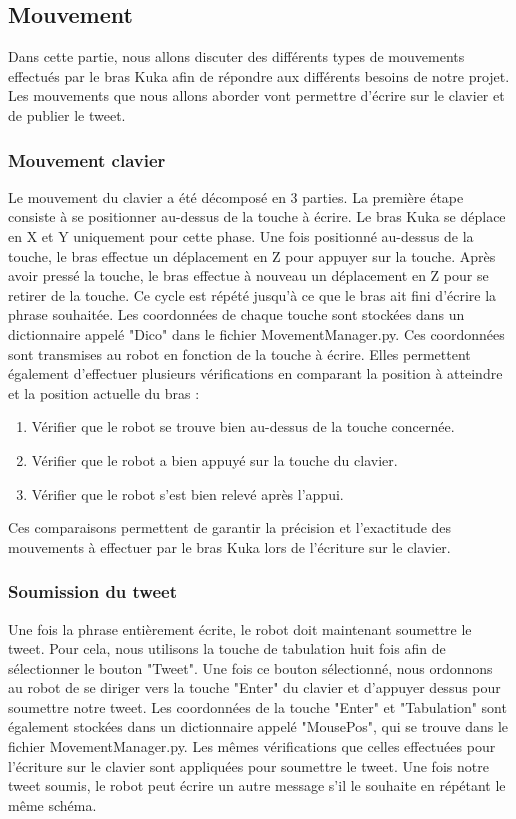 \subsection{Mouvement}

Dans cette partie, nous allons discuter des différents types de mouvements effectués par le bras Kuka afin de répondre aux différents besoins de notre projet. 
Les mouvements que nous allons aborder vont permettre d'écrire sur le clavier et de publier le tweet.

\subsubsection{Mouvement clavier}

Le mouvement du clavier a été décomposé en 3 parties.
La première étape consiste à se positionner au-dessus de la touche à écrire.
Le bras Kuka se déplace en X et Y uniquement pour cette phase. 
Une fois positionné au-dessus de la touche, le bras effectue un déplacement en Z pour appuyer sur la touche. 
Après avoir pressé la touche, le bras effectue à nouveau un déplacement en Z pour se retirer de la touche. 
Ce cycle est répété jusqu'à ce que le bras ait fini d'écrire la phrase souhaitée.
Les coordonnées de chaque touche sont stockées dans un dictionnaire appelé "Dico" dans le fichier MovementManager.py.
Ces coordonnées sont transmises au robot en fonction de la touche à écrire.
Elles permettent également d'effectuer plusieurs vérifications en comparant la position à atteindre et la position actuelle du bras :

\begin{enumerate}
    \item Vérifier que le robot se trouve bien au-dessus de la touche concernée.
    \item Vérifier que le robot a bien appuyé sur la touche du clavier.
    \item Vérifier que le robot s'est bien relevé après l'appui.
\end{enumerate}

Ces comparaisons permettent de garantir la précision et l’exactitude des mouvements à
effectuer par le bras Kuka lors de l’écriture sur le clavier.

\subsubsection{Soumission du tweet}

Une fois la phrase entièrement écrite, le robot doit maintenant soumettre le tweet.
Pour cela, nous utilisons la touche de tabulation huit fois afin de sélectionner le bouton "Tweet".
Une fois ce bouton sélectionné, nous ordonnons au robot de se diriger vers la touche "Enter" du clavier et d'appuyer dessus pour soumettre notre tweet.
Les coordonnées de la touche "Enter" et "Tabulation" sont également stockées dans un dictionnaire appelé "MousePos", qui se trouve dans le fichier MovementManager.py.
Les mêmes vérifications que celles effectuées pour l'écriture sur le clavier sont appliquées pour soumettre le tweet.
Une fois notre tweet soumis, le robot peut écrire un autre message s'il le souhaite en répétant le même schéma.

